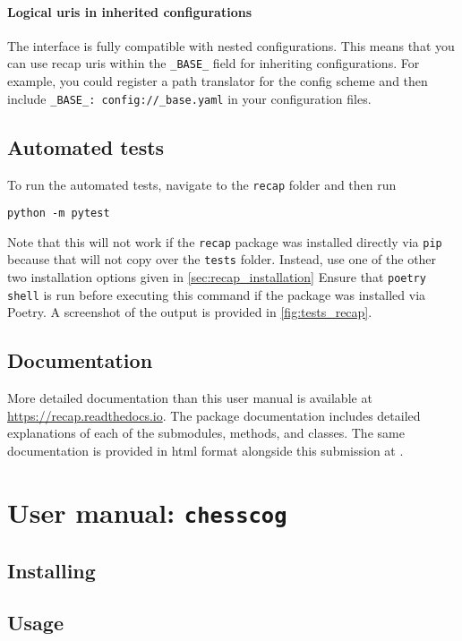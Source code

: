 \documentclass[../../report.tex]{subfiles}
\begin{document}
\subsubsection{Logical \acsp{uri} in inherited configurations}
The  interface is fully compatible with nested configurations.
This means that you can use recap \glspl{uri} within the \texttt{_BASE_} field for inheriting configurations.
For example, you could register a path translator for the config scheme and then include \texttt{_BASE_: config://_base.yaml} in your configuration files.

\section{Automated tests}
\label{sec:recap_tests}
To run the automated tests, navigate to the \texttt{recap} folder and then run
\begin{verbatim}
python -m pytest
\end{verbatim}
Note that this will not work if the \texttt{recap} package was installed directly via \texttt{pip} because that will not copy over the \texttt{tests} folder.
Instead, use one of the other two installation options given in \cref{sec:recap_installation}
Ensure that \texttt{poetry shell} is run before executing this command if the package was installed via Poetry.
A screenshot of the output is provided in \cref{fig:tests_recap}.

\section{Documentation}
\label{sec:recap_documentation}
More detailed documentation than this user manual is available at \url{https://recap.readthedocs.io}.
The package documentation includes detailed explanations of each of the submodules, methods, and classes.
The same documentation is provided in \gls{html} format alongside this submission at .

\chapter{User manual: \texttt{chesscog}}
\label{chap:user_man_chesscog}

\section{Installing}

\section{Usage}
\end{document}
